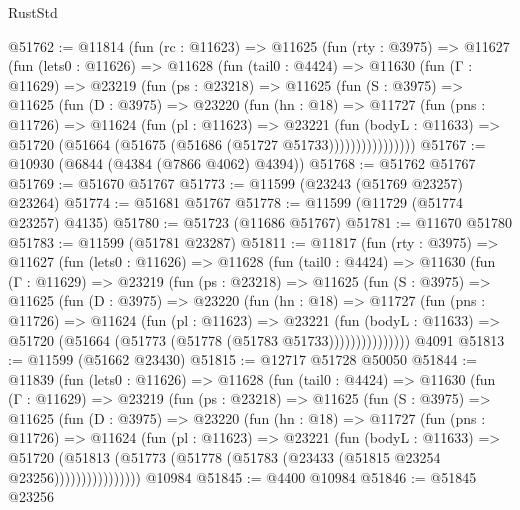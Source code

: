 \begin{lexlean}{RustStd}
\begin{coremodule}
@51762 := @11814
    (fun (rc : @11623) =>
    @11625
      (fun (rty : @3975) =>
      @11627
        (fun (lets0 : @11626) =>
        @11628
          (fun (tail0 : @4424) =>
          @11630
            (fun (Γ : @11629) =>
            @23219
              (fun (ps : @23218) =>
              @11625
                (fun (S : @3975) =>
                @11625
                  (fun (D : @3975) =>
                  @23220
                    (fun (hn : @18) =>
                    @11727
                      (fun (pns : @11726) =>
                      @11624
                        (fun (pl : @11623) =>
                        @23221
                          (fun (bodyL : @11633) =>
                          @51720 (@51664 (@51675 (@51686 (@51727 @51733))))))))))))))))
@51767 := @10930 (@6844 (@4384 (@7866 @4062) @4394))
@51768 := @51762 @51767
@51769 := @51670 @51767
@51773 := @11599 (@23243 (@51769 @23257) @23264)
@51774 := @51681 @51767
@51778 := @11599 (@11729 (@51774 @23257) @4135)
@51780 := @51723 (@11686 @51767)
@51781 := @11670 @51780
@51783 := @11599 (@51781 @23287)
@51811 := @11817
    (fun (rty : @3975) =>
    @11627
      (fun (lets0 : @11626) =>
      @11628
        (fun (tail0 : @4424) =>
        @11630
          (fun (Γ : @11629) =>
          @23219
            (fun (ps : @23218) =>
            @11625
              (fun (S : @3975) =>
              @11625
                (fun (D : @3975) =>
                @23220
                  (fun (hn : @18) =>
                  @11727
                    (fun (pns : @11726) =>
                    @11624
                      (fun (pl : @11623) =>
                      @23221
                        (fun (bodyL : @11633) =>
                        @51720 (@51664 (@51773 (@51778 (@51783 @51733)))))))))))))))
    @4091
@51813 := @11599 (@51662 @23430)
@51815 := @12717 @51728 @50050
@51844 := @11839
    (fun (lets0 : @11626) =>
    @11628
      (fun (tail0 : @4424) =>
      @11630
        (fun (Γ : @11629) =>
        @23219
          (fun (ps : @23218) =>
          @11625
            (fun (S : @3975) =>
            @11625
              (fun (D : @3975) =>
              @23220
                (fun (hn : @18) =>
                @11727
                  (fun (pns : @11726) =>
                  @11624
                    (fun (pl : @11623) =>
                    @23221
                      (fun (bodyL : @11633) =>
                      @51720
                        (@51813
                          (@51773 (@51778 (@51783 (@23433 (@51815 @23254 @23256))))))))))))))))
    @10984
@51845 := @4400 @10984
@51846 := @51845 @23256

\end{coremodule}
\end{lexlean}

